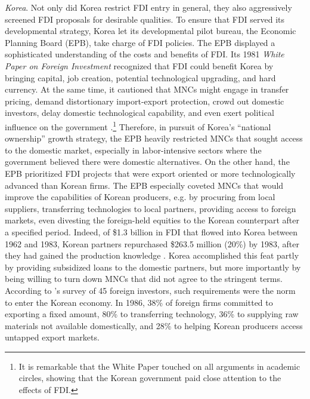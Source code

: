 \textit{Korea}. Not only did Korea restrict FDI entry in general, they also
aggressively screened FDI proposals for desirable qualities. To ensure that FDI
served its developmental strategy, Korea let its developmental pilot bureau, the
Economic Planning Board (EPB), take charge of FDI policies. The EPB displayed a
sophisticated understanding of the costs and benefits of FDI. Its 1981
\textit{White Paper on Foreign Investment} recognized that FDI could benefit
Korea by bringing capital, job creation, potential technological upgrading, and
hard currency. At the same time, it cautioned that MNCs might engage in transfer
pricing, demand distortionary import-export protection, crowd out domestic
investors, delay domestic technological capability, and even exert political
influence on the government \citep[50-64, quoted in
\citet{Chang2004}]{EPB1981}.\footnote{It is remarkable that the White Paper
  touched on all arguments in academic circles, showing that the Korean
  government paid close attention to the effects of FDI.} Therefore, in pursuit
of Korea's ``national ownership'' growth strategy, the EPB heavily restricted
MNCs that sought access to the domestic market, especially in labor-intensive
sectors where the government believed there were domestic alternatives. On the
other hand, the EPB prioritized FDI projects that were export oriented or more
technologically advanced than Korean firms. The EPB especially coveted MNCs that
would improve the capabilities of Korean producers, e.g. by procuring from local
suppliers, transferring technologies to local partners, providing access to
foreign markets, even divesting the foreign-held equities to the Korean
counterpart after a specified period. Indeed, of \$1.3 billion in FDI that
flowed into Korea between 1962 and 1983, Korean partners repurchased \$263.5
million (20\%) by 1983, after they had gained the production knowledge
\citep[135]{Mardon1990}. Korea accomplished this feat partly by providing
subsidized loans to the domestic partners, but more importantly by being willing
to turn down MNCs that did not agree to the stringent terms. According to
\citet{Mardon1990}'s survey of 45 foreign investors, such requirements were the
norm to enter the Korean economy. In 1986, 38\% of foreign firms committed to
exporting a fixed amount, 80\% to transferring technology, 36\% to supplying raw
materials not available domestically, and 28\% to helping Korean producers
access untapped export markets.

